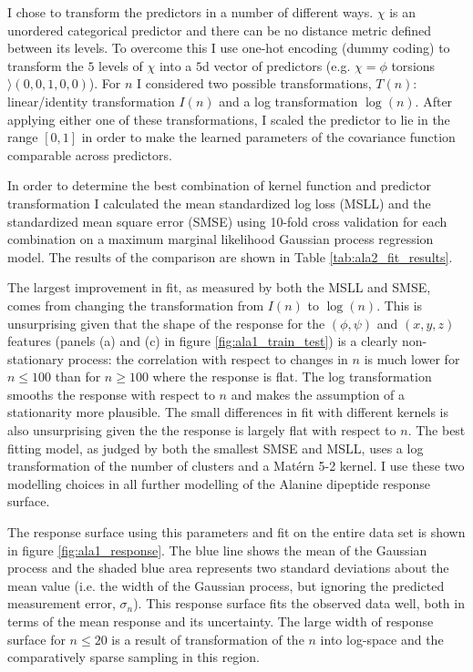 I chose to transform the predictors in a number of different ways. $\chi$ is an unordered categorical predictor and there can be no distance metric defined between its levels. To overcome this I use one-hot encoding (dummy coding) to transform the $5$ levels of $\chi$ into a $5$d vector of predictors (e.g. $\chi = \phi$ torsions $\rangle (0, 0, 1, 0, 0)$).  For $n$ I considered two possible transformations, $T(n)$: linear/identity transformation $I(n)$ and a log transformation $\log{(n)}$. After applying either one of these transformations, I scaled the predictor to lie in the range $[0, 1]$ in order to make the learned parameters of the covariance function comparable across predictors. 

In order to determine the best combination of kernel function and predictor transformation I calculated the mean standardized log loss (MSLL) and the standardized mean square error (SMSE) using 10-fold cross validation for each combination on a maximum marginal likelihood Gaussian process regression model.  The results of the comparison are shown in Table \ref{tab:ala2_fit_results}. 



The largest improvement in fit, as measured by both the MSLL and SMSE, comes from changing the transformation from $I(n)$ to $\log{(n)}$. This is unsurprising given that the shape of the response for the $(\phi, \psi)$ and $(x,y,z)$ features (panels (a) and (c) in figure \ref{fig:ala1_train_test}) is a clearly non-stationary process: the correlation with respect to changes in $n$ is much lower for $n\leq 100$ than for $n\geq 100$ where the response is flat. The log transformation smooths the response with respect to $n$ and makes the assumption of a stationarity more plausible. The small differences in fit with different kernels is also unsurprising given the the response is largely flat with respect to $n$. The best fitting model, as judged by both the smallest SMSE and MSLL, uses a log transformation of the number of clusters and a Mat{\'e}rn 5-2 kernel. I use these two modelling choices in all further modelling of the Alanine dipeptide response surface.  

The response surface using this parameters and fit on the entire data set is shown in figure \ref{fig:ala1_response}. The blue line shows the mean of the Gaussian process and the shaded blue area represents two standard deviations about the mean value (i.e. the width of the Gaussian process, but ignoring the predicted measurement error, $\sigma_n$). This response surface fits the observed data well, both in terms of the mean response and its uncertainty. The large width of response surface for $n \leq 20$ is a result of transformation of the $n$ into log-space and the comparatively sparse sampling in this region.




